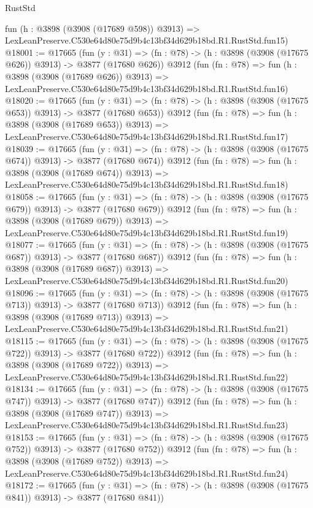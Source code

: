 \begin{lexlean}{RustStd}
\begin{coremodule}
    fun (h : @3898 (@3908 (@17689 @598)) @3913) =>
    LexLeanPreserve.C530e64d80e75d9b4c13bf34d629b18bd.R1.RustStd.fun15)
@18001 := @17665
    (fun (y : @31) => (fn : @78) -> (h : @3898 (@3908 (@17675 @626)) @3913) -> @3877 (@17680 @626))
    @3912
    (fun (fn : @78) =>
    fun (h : @3898 (@3908 (@17689 @626)) @3913) =>
    LexLeanPreserve.C530e64d80e75d9b4c13bf34d629b18bd.R1.RustStd.fun16)
@18020 := @17665
    (fun (y : @31) => (fn : @78) -> (h : @3898 (@3908 (@17675 @653)) @3913) -> @3877 (@17680 @653))
    @3912
    (fun (fn : @78) =>
    fun (h : @3898 (@3908 (@17689 @653)) @3913) =>
    LexLeanPreserve.C530e64d80e75d9b4c13bf34d629b18bd.R1.RustStd.fun17)
@18039 := @17665
    (fun (y : @31) => (fn : @78) -> (h : @3898 (@3908 (@17675 @674)) @3913) -> @3877 (@17680 @674))
    @3912
    (fun (fn : @78) =>
    fun (h : @3898 (@3908 (@17689 @674)) @3913) =>
    LexLeanPreserve.C530e64d80e75d9b4c13bf34d629b18bd.R1.RustStd.fun18)
@18058 := @17665
    (fun (y : @31) => (fn : @78) -> (h : @3898 (@3908 (@17675 @679)) @3913) -> @3877 (@17680 @679))
    @3912
    (fun (fn : @78) =>
    fun (h : @3898 (@3908 (@17689 @679)) @3913) =>
    LexLeanPreserve.C530e64d80e75d9b4c13bf34d629b18bd.R1.RustStd.fun19)
@18077 := @17665
    (fun (y : @31) => (fn : @78) -> (h : @3898 (@3908 (@17675 @687)) @3913) -> @3877 (@17680 @687))
    @3912
    (fun (fn : @78) =>
    fun (h : @3898 (@3908 (@17689 @687)) @3913) =>
    LexLeanPreserve.C530e64d80e75d9b4c13bf34d629b18bd.R1.RustStd.fun20)
@18096 := @17665
    (fun (y : @31) => (fn : @78) -> (h : @3898 (@3908 (@17675 @713)) @3913) -> @3877 (@17680 @713))
    @3912
    (fun (fn : @78) =>
    fun (h : @3898 (@3908 (@17689 @713)) @3913) =>
    LexLeanPreserve.C530e64d80e75d9b4c13bf34d629b18bd.R1.RustStd.fun21)
@18115 := @17665
    (fun (y : @31) => (fn : @78) -> (h : @3898 (@3908 (@17675 @722)) @3913) -> @3877 (@17680 @722))
    @3912
    (fun (fn : @78) =>
    fun (h : @3898 (@3908 (@17689 @722)) @3913) =>
    LexLeanPreserve.C530e64d80e75d9b4c13bf34d629b18bd.R1.RustStd.fun22)
@18134 := @17665
    (fun (y : @31) => (fn : @78) -> (h : @3898 (@3908 (@17675 @747)) @3913) -> @3877 (@17680 @747))
    @3912
    (fun (fn : @78) =>
    fun (h : @3898 (@3908 (@17689 @747)) @3913) =>
    LexLeanPreserve.C530e64d80e75d9b4c13bf34d629b18bd.R1.RustStd.fun23)
@18153 := @17665
    (fun (y : @31) => (fn : @78) -> (h : @3898 (@3908 (@17675 @752)) @3913) -> @3877 (@17680 @752))
    @3912
    (fun (fn : @78) =>
    fun (h : @3898 (@3908 (@17689 @752)) @3913) =>
    LexLeanPreserve.C530e64d80e75d9b4c13bf34d629b18bd.R1.RustStd.fun24)
@18172 := @17665
    (fun (y : @31) => (fn : @78) -> (h : @3898 (@3908 (@17675 @841)) @3913) -> @3877 (@17680 @841))

\end{coremodule}
\end{lexlean}
